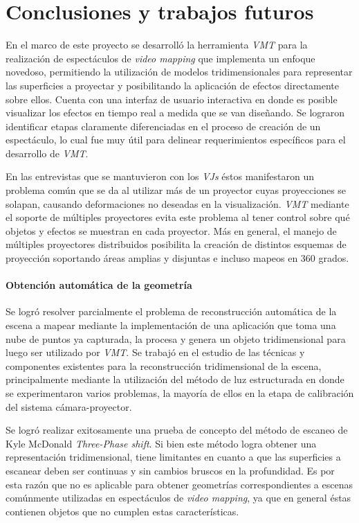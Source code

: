﻿\chapter{Conclusiones y trabajos futuros}

En el marco de este proyecto se desarrolló la herramienta \emph{VMT} para la realización de espectáculos de \emph{video mapping} que implementa un enfoque novedoso, permitiendo la utilización de modelos tridimensionales para representar las superficies a proyectar y posibilitando la aplicación de efectos directamente sobre ellos. Cuenta con una interfaz de usuario interactiva en donde es posible visualizar los efectos en tiempo real a medida que se van diseñando.
Se lograron identificar etapas claramente diferenciadas en el proceso de creación de un espectáculo, lo cual fue muy útil para delinear requerimientos específicos para el desarrollo de \emph{VMT}. 

En las entrevistas que se mantuvieron con los \emph{VJs} éstos manifestaron un problema común que se da al utilizar más de un proyector cuyas proyecciones se solapan, causando deformaciones no deseadas en la visualización. \emph{VMT} mediante el soporte de múltiples proyectores evita este problema al tener control sobre qué objetos y efectos se muestran en cada proyector. Más en general, el manejo de múltiples proyectores distribuidos posibilita la creación de distintos esquemas de proyección soportando áreas amplias y disjuntas e incluso mapeos en 360 grados.

\subsubsection{Obtención automática de la geometría}

Se logró resolver parcialmente el problema de reconstrucción automática de la escena a mapear mediante la implementación de una aplicación que toma una nube de puntos ya capturada, la procesa y genera un objeto tridimensional para luego ser utilizado por \emph{VMT}.
Se trabajó en el estudio de las técnicas y componentes existentes para la reconstrucción tridimensional de la escena, principalmente mediante la utilización del método de luz estructurada en donde se experimentaron varios problemas, la mayoría de ellos en la etapa de calibración del sistema cámara-proyector. 

Se logró realizar exitosamente una prueba de concepto del método de escaneo de Kyle McDonald \emph{Three-Phase shift}.
Si bien este método logra obtener una representación tridimensional, tiene limitantes en cuanto a que las superficies a escanear deben ser continuas y sin cambios bruscos en la profundidad. Es por esta razón que no es aplicable para obtener geometrías correspondientes a escenas comúnmente utilizadas en espectáculos de \emph{video mapping}, ya que en general éstas contienen objetos que no cumplen estas características.

